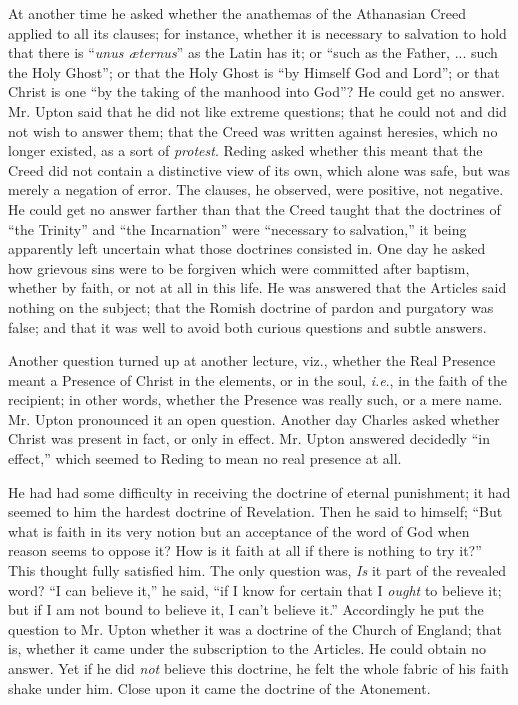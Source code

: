 At another time he asked whether the anathemas of the Athanasian
Creed applied to all its clauses; for instance, whether it is
necessary to salvation to hold that there is ``\emph{unus æternus}''
as the Latin has it; or ``such as the Father, ... such the
Holy Ghost''; or that the Holy Ghost is ``by Himself God and
Lord''; or that Christ is one ``by the taking of the manhood
into God''? He could get no answer. Mr. Upton said that he did not
like extreme questions; that he could not and did not wish to answer
them; that the Creed was written against heresies, which no longer
existed, as a sort of \emph{protest}. Reding asked whether this meant
that the Creed did not contain a distinctive view of its own, which
alone was safe, but was merely a negation of error. The clauses, he
observed, were positive, not negative. He could get no answer farther
than that the Creed taught that the doctrines of ``the
Trinity'' and ``the Incarnation'' were ``necessary to
salvation,'' it being apparently left uncertain what those
doctrines consisted in. One day he asked how grievous sins were to be
forgiven which were committed after baptism, whether by faith, or not
at all in this life. He was answered that the Articles said nothing on
the subject; that the Romish doctrine of pardon and purgatory was
false; and that it was well to avoid both curious questions and subtle
answers.

Another question turned up at another lecture, viz., whether the
Real Presence meant a Presence of Christ in the elements, or in the
soul, \emph{i.e}., in the faith of the recipient; in other words,
whether the Presence was really such, or a mere name. Mr. Upton
pronounced it an open question. Another day Charles asked whether
Christ was present in fact, or only in effect. Mr. Upton answered
decidedly ``in effect,'' which seemed to Reding to mean no
real presence at all.

He had had some difficulty in receiving the doctrine of eternal
punishment; it had seemed to him the hardest doctrine of Revelation.
Then he said to himself; ``But what is faith in its very notion
but an acceptance of the word of God when reason seems to oppose it?
How is it faith at all if there is nothing to try it?'' This
thought fully satisfied him. The only question was, \emph{Is} it part
of the revealed word? ``I can believe it,'' he said, ``if
I know for certain that I \emph{ought} to believe it; but if I am not
bound to believe it, I can't believe it.'' Accordingly he put the
question to Mr. Upton whether it was a doctrine of the Church of
England; that is, whether it came under the subscription to the
Articles. He could obtain no answer. Yet if he did \emph{not} believe
this doctrine, he felt the whole fabric of his faith shake under him.
Close upon it came the doctrine of the Atonement.

